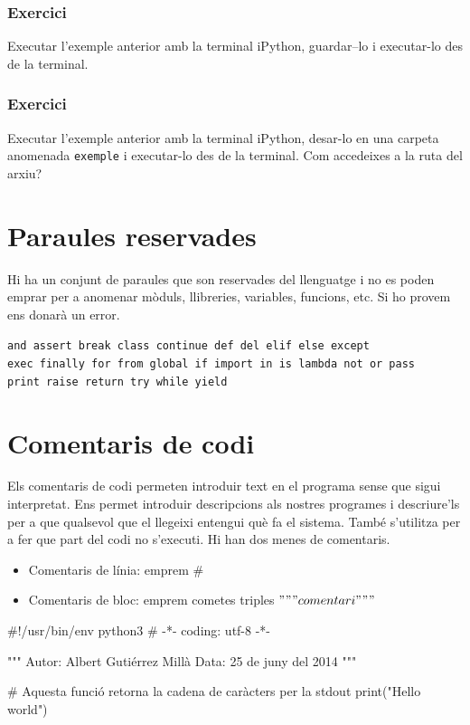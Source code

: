\subsubsection*{Exercici } 


Executar l'exemple anterior amb la terminal iPython, guardar--lo i executar-lo des de la terminal.


\subsubsection*{Exercici } 


Executar l'exemple anterior amb la terminal iPython, desar-lo en una carpeta anomenada {\tt exemple} i executar-lo des de la terminal. Com accedeixes a la ruta del arxiu?



\section{Paraules reservades}


Hi ha un conjunt de paraules que son reservades del llenguatge i no es poden emprar per a anomenar mòduls, llibreries, variables, funcions, etc. Si ho provem ens donarà un error.

{\tt and assert break class continue def del elif else except \\
exec finally for from global if import in is lambda not or pass \\
print raise return try while yield}




  
\section{Comentaris de codi}



Els comentaris de codi permeten introduir text en el programa sense que sigui interpretat. Ens permet introduir descripcions als nostres programes i descriure'ls per a que qualsevol que el llegeixi entengui què fa el sistema. També s'utilitza per a fer que part del codi no s'executi. Hi han dos menes de comentaris.


\begin{itemize}
    \item Comentaris de línia: emprem \#
    \item Comentaris de bloc: emprem cometes triples $""" comentari """$
\end{itemize}

\begin{blockcode}
#!/usr/bin/env python3
# -*- coding: utf-8 -*-

"""
Autor: Albert Gutiérrez Millà
Data: 25 de juny del 2014
"""

# Aquesta funció retorna la cadena de caràcters per la stdout
print("Hello world")
\end{blockcode}


